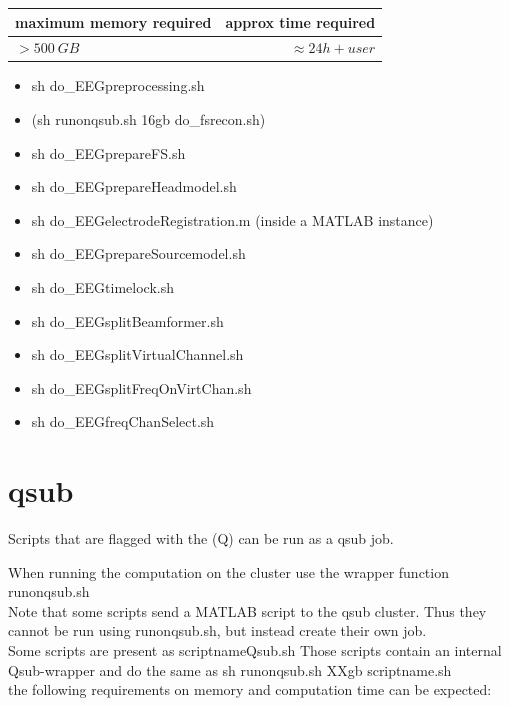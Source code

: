 \documentclass[12pt,a4paper]{scrartcl}
\begin{document}
\begin{table}[h]
\begin{tabular}{l | r}
\toprule
maximum memory required & approx time required\\\toprule
$>500~GB$ & $\approx 24h+user$ \\\bottomrule
\end{tabular}
\end{table}
\begin{itemize}
\item sh do\_EEGpreprocessing.sh
\item (sh runonqsub.sh 16gb do\_fsrecon.sh)
\item sh do\_EEGprepareFS.sh
\item sh do\_EEGprepareHeadmodel.sh
\item sh do\_EEGelectrodeRegistration.m (inside a MATLAB instance)
\item sh do\_EEGprepareSourcemodel.sh
\item sh do\_EEGtimelock.sh
\item sh do\_EEGsplitBeamformer.sh
\item sh do\_EEGsplitVirtualChannel.sh
\item sh do\_EEGsplitFreqOnVirtChan.sh
\item sh do\_EEGfreqChanSelect.sh
\end{itemize}


\section{qsub}
Scripts that are flagged with the (Q) can be run as a qsub job.

\noindent When running the computation on the cluster use the wrapper function runonqsub.sh\\

\noindent Note that some scripts send a MATLAB script to the qsub cluster. Thus they cannot be run using runonqsub.sh, but instead create their own job.\\

\noindent Some scripts are present as scriptnameQsub.sh Those scripts contain an internal Qsub-wrapper and do the same as sh runonqsub.sh XXgb scriptname.sh\\

\noindent the following requirements on memory and computation time can be expected:
\end{document}
